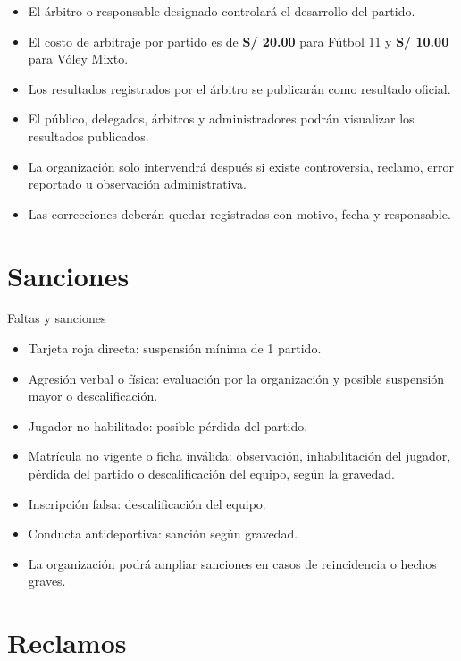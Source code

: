 \documentclass[12pt,a4paper]{article}
\begin{document}
	\begin{itemize}
		\item El árbitro o responsable designado controlará el desarrollo del partido.
		\item El costo de arbitraje por partido es de \textbf{S/ 20.00} para Fútbol 11 y \textbf{S/ 10.00} para Vóley Mixto.
		\item Los resultados registrados por el árbitro se publicarán como resultado oficial.
		\item El público, delegados, árbitros y administradores podrán visualizar los resultados publicados.
		\item La organización solo intervendrá después si existe controversia, reclamo, error reportado u observación administrativa.
		\item Las correcciones deberán quedar registradas con motivo, fecha y responsable.
	\end{itemize}
	
	\section{Sanciones}
	
	\begin{cajaAdvertencia}{Faltas y sanciones}
		\begin{itemize}
			\item Tarjeta roja directa: suspensión mínima de 1 partido.
			\item Agresión verbal o física: evaluación por la organización y posible suspensión mayor o descalificación.
			\item Jugador no habilitado: posible pérdida del partido.
			\item Matrícula no vigente o ficha inválida: observación, inhabilitación del jugador, pérdida del partido o descalificación del equipo, según la gravedad.
			\item Inscripción falsa: descalificación del equipo.
			\item Conducta antideportiva: sanción según gravedad.
			\item La organización podrá ampliar sanciones en casos de reincidencia o hechos graves.
		\end{itemize}
	\end{cajaAdvertencia}
	
	\section{Reclamos}
	
\end{document}
